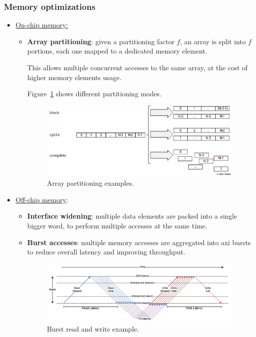 \documentclass[11pt,a4paper,oneside]{memoir}
\begin{document}
\subsubsection{Memory optimizations}
\begin{itemize}
	\item \underline{On-chip memory:}
		\begin{itemize}
			\item \textbf{Array partitioning}: given a partitioning
				factor $f$, an array is split into $f$
				portions, each one mapped to a dedicated memory
				element.

				This allows multiple concurrent accesses to the
				same array, at the cost of higher memory
				elements usage.

				Figure~\ref{fig:array_partitioning} shows
				different partitioning modes.
				\begin{figure}[!htb]
					\centering
					\includegraphics[width=.8\textwidth]{
						array_partitioning}
					\caption{Array partitioning examples.}
					\label{fig:array_partitioning}
				\end{figure}
		\end{itemize}
	\item \underline{Off-chip memory}:
		\begin{itemize}
			\item \textbf{Interface widening}: multiple data
				elements are packed into a single bigger word,
				to perform multiple accesses at the same time.
			\item \textbf{Burst accesses}: multiple memory accesses
				are aggregated into \ac{axi} bursts to reduce
				overall latency and improving throughput.
				\begin{figure}[!htb]
					\centering
					\includegraphics[width=.9\textwidth]{
						burst}
					\caption{Burst read and write example.}
				\end{figure}
		\end{itemize}
\end{itemize}
\end{document}
